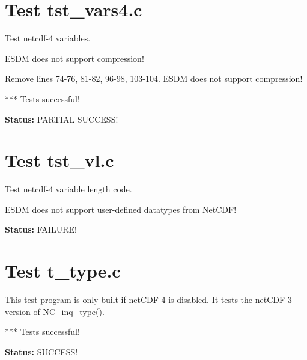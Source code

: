 \section{Test tst\_vars4.c}

Test netcdf-4 variables.

ESDM does not support compression!

Remove lines 74-76, 81-82, 96-98, 103-104. ESDM does not support compression!

*** Tests successful!

{\bf \large Status: } PARTIAL SUCCESS!

\section{Test tst\_vl.c}

Test netcdf-4 variable length code.

ESDM does not support user-defined datatypes from NetCDF!

{\bf \large Status: } FAILURE!

\section{Test t\_type.c}

This test program is only built if netCDF-4 is disabled. It tests
   the netCDF-3 version of NC\_inq\_type().

*** Tests successful!

{\bf \large Status: } SUCCESS!
